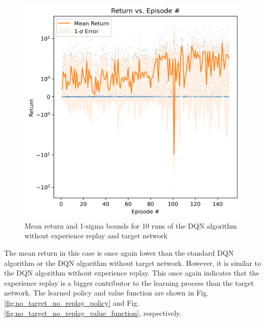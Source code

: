 \documentclass[conference]{IEEEtran}
\begin{document}
\begin{figure}[h]
\centering
\includegraphics[width=0.95\linewidth]{../figures/no_target_no_replay/mean_return_150_1_log_True.png}
\caption{Mean return and 1-sigma bounds for 10 runs of the DQN algorithm without experience replay and target network}
\label{fig:no_target_no_replay_10_runs}
\end{figure}
The mean return in this case is once again lower than the standard DQN algorithm or the DQN algorithm without target network. However, it is similar to the DQN algorithm without experience replay. This once again indicates that the experience replay is a bigger contributor to the learning process than the target network. The learned policy and value function are shown in Fig. \ref{fig:no_target_no_replay_policy} and Fig. \ref{fig:no_target_no_replay_value_function}, respectively.
\end{document}
